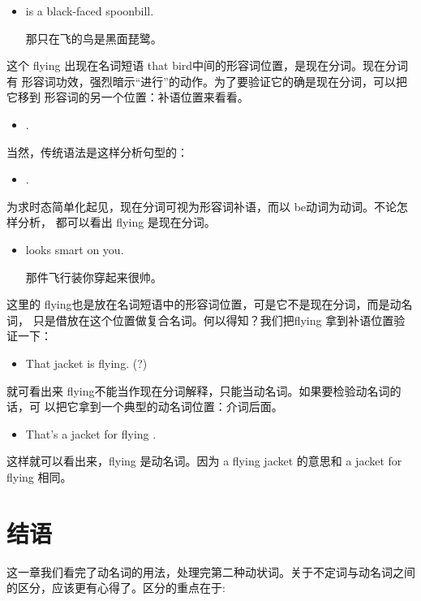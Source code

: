 \begin{itemize}
\item {} is a black-faced spoonbill.

  那只在飞的鸟是黑面琵鹭。
\end{itemize}

这个 flying 出现在名词短语 that bird中间的形容词位置，是现在分词。现在分词有
形容词功效，强烈暗示“进行”的动作。为了要验证它的确是现在分词，可以把它移到
形容词的另一个位置：补语位置来看看。

\begin{itemize}
\item  {}  .
\end{itemize}

当然，传统语法是这样分析句型的：

\begin{itemize}
\item  {} .
\end{itemize}

为求时态简单化起见，现在分词可视为形容词补语，而以 be动词为动词。不论怎样分析，
都可以看出 flying 是现在分词。

\begin{itemize}
\item  {} looks smart on you.

  那件飞行装你穿起来很帅。
\end{itemize}
这里的 flying也是放在名词短语中的形容词位置，可是它不是现在分词，而是动名词，
只是借放在这个位置做复合名词。何以得知？我们把flying 拿到补语位置验证一下：

\begin{itemize}
\item  That jacket is flying. (?)
\end{itemize}
就可看出来 flying不能当作现在分词解释，只能当动名词。如果要检验动名词的话，可
以把它拿到一个典型的动名词位置：介词后面。
\begin{itemize}
\item  That's a jacket for flying .
\end{itemize}
这样就可以看出来，flying 是动名词。因为 a flying jacket 的意思和 a
jacket for flying 相同。

\section{结语}

这一章我们看完了动名词的用法，处理完第二种动状词。关于不定词与动名词之间的区分，应该更有心得了。区分的重点在于:

